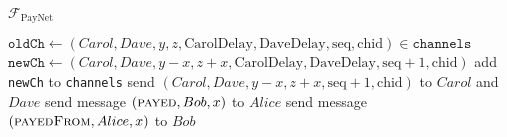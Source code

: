\begin{functionality}{$\mathcal{F}_{\mathrm{PayNet}}$}
\begin{algorithmic}[1]
        \State $\mathtt{oldCh} \gets \left(Carol, Dave, y, z,
        \mathrm{CarolDelay}, \mathrm{DaveDelay}, \mathrm{seq},
        \mathrm{chid}\right) \in \mathtt{channels}$
        \State $\mathtt{newCh} \gets \left(Carol, Dave, y - x, z + x,
        \mathrm{CarolDelay}, \mathrm{DaveDelay}, \mathrm{seq} + 1,
        \mathrm{chid}\right)$
        \State add \texttt{newCh} to \texttt{channels}
        \State send $\left(Carol, Dave, y - x, z + x, \mathrm{seq} + 1,
        \mathrm{chid}\right)$ to $Carol$ and $Dave$ 
      \EndFor
      \State send message $\left(\textsc{payed}, Bob, x\right)$ to $Alice$
      \State send message $\left(\textsc{payedFrom}, Alice, x\right)$ to $Bob$
    \EndIndent
    \State


\end{algorithmic}
\end{functionality}
